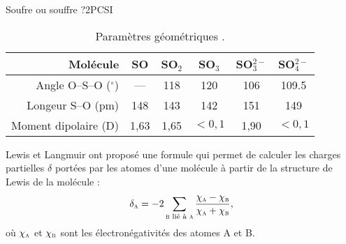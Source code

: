 \begin{exercise}{Soufre ou souffre ?}{2}{PCSI}
\begin{questions}
    
    \begin{table}[H]
    \centering
    \begin{tabularx}{.7\linewidth}{r|CCCCC}
        Molécule & SO & SO$_2$ & SO$_3$ & SO$_3^{2-}$ & SO$_4^{2-}$ \\ \hline\hline
        Angle O--S--O ($^\circ$) & --- & 118 & 120 & 106 & 109.5 \\ 
        Longeur S--O (pm) & 148 & 143 & 142 & 151 & 149  \\
       Moment dipolaire (D) & 1,63 & 1,65 & $< 0,1$ & 1,90 & $< 0,1$ \\ \hline
    \end{tabularx}
    \caption{Paramètres géométriques .}
\end{table}
    
    \question Lewis et Langmuir ont proposé une formule qui permet de calculer les charges partielles $\delta$ portées par les atomes d’une molécule à partir de la structure de Lewis de la molécule :
    $$\delta_\textsc{a} = - 2 \sum_{\textsc{b} \text{ lié à } \textsc{a}} \dfrac{\chi_\textsc{a} - \chi_\textsc{b}}{\chi_\textsc{a} + \chi_\textsc{b}},$$
    où $\chi_\textsc{a}$ et $\chi_\textsc{b}$ sont les électronégativités des atomes A et B.

\end{questions}
\end{exercise}
